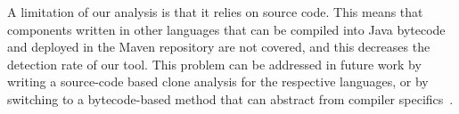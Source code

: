 A limitation of our analysis is that it relies on source code. This means that components written in other languages that can be compiled into Java bytecode and deployed in the Maven repository are not covered, and this decreases the detection rate of our tool. This problem can be addressed in future work by writing a source-code based clone analysis for the respective languages, or by switching to a bytecode-based method that can abstract from compiler specifics~\cite{dann2019sootdiff}. 



 

 

